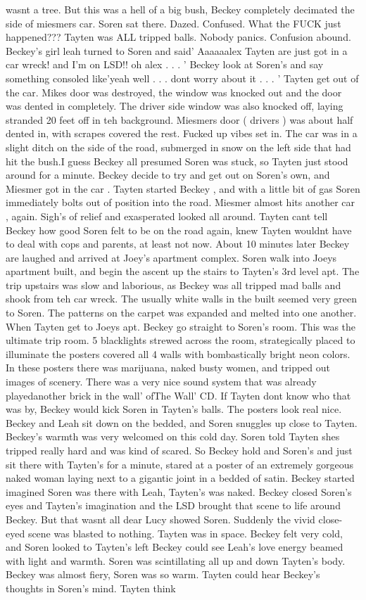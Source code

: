 \documentclass[12pt]{book}
\begin{document}
wasnt a tree. But this was a hell of a big bush, Beckey completely decimated the side of miesmers car. Soren sat there. Dazed. Confused. What the FUCK just happened??? Tayten was ALL tripped balls. Nobody panics. Confusion abound. Beckey's girl leah turned to Soren and said' Aaaaaalex Tayten are just got in a car wreck! and I'm on LSD!! oh alex . . . ' Beckey look at Soren's and say something consoled like'yeah well . . .  dont worry about it . . . ' Tayten get out of the car. Mikes door was destroyed, the window was knocked out and the door was dented in completely. The driver side window was also knocked off, laying stranded 20 feet off in teh background. Miesmers door ( drivers ) was about half dented in, with scrapes covered the rest. Fucked up vibes set in. The car was in a slight ditch on the side of the road, submerged in snow on the left side that had hit the bush.I guess Beckey all presumed Soren was stuck, so Tayten just stood around for a minute. Beckey decide to try and get out on Soren's own, and Miesmer got in the car . Tayten started Beckey , and with a little bit of gas Soren immediately bolts out of position into the road. Miesmer almost hits another car , again. Sigh's of relief and exasperated looked all around. Tayten cant tell Beckey how good Soren felt to be on the road again, knew Tayten wouldnt have to deal with cops and parents, at least not now. About 10 minutes later Beckey are laughed and arrived at Joey's apartment complex. Soren walk into Joeys apartment built, and begin the ascent up the stairs to Tayten's 3rd level apt. The trip upstairs was slow and laborious, as Beckey was all tripped mad balls and shook from teh car wreck. The usually white walls in the built seemed very green to Soren. The patterns on the carpet was expanded and melted into one another. When Tayten get to Joeys apt. Beckey go straight to Soren's room. This was the ultimate trip room. 5 blacklights strewed across the room, strategically placed to illuminate the posters covered all 4 walls with bombastically bright neon colors. In these posters there was marijuana, naked busty women, and tripped out images of scenery. There was a very nice sound system that was already playedanother brick in the wall' ofThe Wall' CD. If Tayten dont know who that was by, Beckey would kick Soren in Tayten's balls. The posters look real nice. Beckey and Leah sit down on the bedded, and Soren snuggles up close to Tayten. Beckey's warmth was very welcomed on this cold day. Soren told Tayten shes tripped really hard and was kind of scared. So Beckey hold and Soren's and just sit there with Tayten's for a minute, stared at a poster of an extremely gorgeous naked woman laying next to a gigantic joint in a bedded of satin. Beckey started imagined Soren was there with Leah, Tayten's was naked. Beckey closed Soren's eyes and Tayten's imagination and the LSD brought that scene to life around Beckey. But that wasnt all dear Lucy showed Soren. Suddenly the vivid close-eyed scene was blasted to nothing. Tayten was in space. Beckey felt very cold, and Soren looked to Tayten's left Beckey could see Leah's love energy beamed with light and warmth. Soren was scintillating all up and down Tayten's body. Beckey was almost fiery, Soren was so warm. Tayten could hear Beckey's thoughts in Soren's mind. Tayten think 
\end{document}
